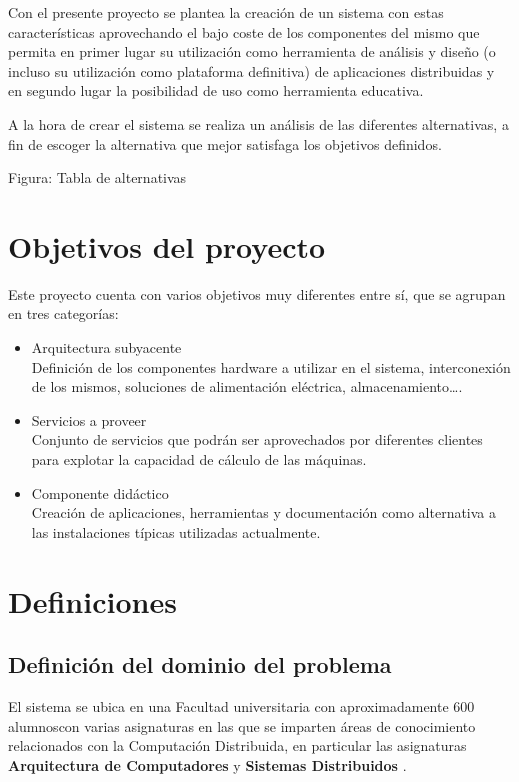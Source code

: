 Con el presente proyecto se plantea la creación de un sistema con estas características aprovechando el bajo coste de los componentes del mismo que permita en primer lugar su utilización como herramienta de análisis y diseño (o incluso su utilización como plataforma definitiva) de aplicaciones distribuidas y en segundo lugar la posibilidad de uso como herramienta educativa.

A la hora de crear el sistema se realiza un análisis de las diferentes alternativas, a fin de escoger la alternativa que mejor satisfaga los objetivos definidos.

Figura: Tabla de alternativas

\section{Objetivos del proyecto}

Este proyecto cuenta con varios objetivos muy diferentes entre sí, que se agrupan en tres categorías:
\begin{itemize}
  \item Arquitectura subyacente\\
  Definición de los componentes hardware a utilizar en el sistema, interconexión de los mismos, soluciones de alimentación eléctrica, almacenamiento\dots.
  \item Servicios a proveer\\
  Conjunto de servicios que podrán ser aprovechados por diferentes clientes para explotar la capacidad de cálculo de las máquinas.
  \item Componente didáctico\\
  Creación de aplicaciones, herramientas y documentación como alternativa a las instalaciones típicas utilizadas actualmente.
\end{itemize}

\section{Definiciones}

\subsection{Definición del dominio del problema}

El sistema se ubica en una Facultad universitaria con aproximadamente 600 alumnos\citationneeded con varias asignaturas en las que se imparten áreas de conocimiento relacionados con la Computación Distribuida, en particular las asignaturas \textbf{Arquitectura de Computadores} y \textbf{Sistemas Distribuidos} \cite{DIA15GuiaAcademica}.

